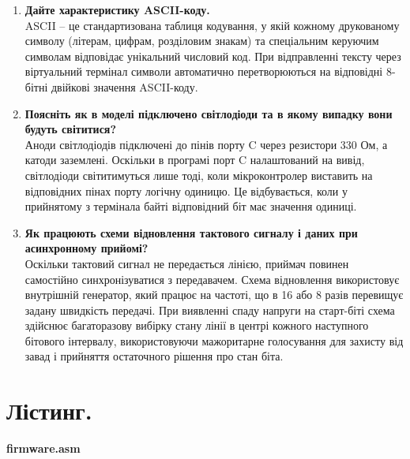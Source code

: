 \documentclass[14pt, a4paper]{extreport}
\begin{document}
\begin{enumerate}
		\item \textbf{Дайте характеристику ASCII-коду.} \\ ASCII -- це стандартизована таблиця кодування, у якій кожному друкованому символу (літерам, цифрам, розділовим знакам) та спеціальним керуючим символам відповідає унікальний числовий код. При відправленні тексту через віртуальний термінал символи автоматично перетворюються на відповідні 8-бітні двійкові значення ASCII-коду.
		
		\item \textbf{Поясніть як в моделі підключено світлодіоди та в якому випадку вони будуть світитися?} \\ Аноди світлодіодів підключені до пінів порту C через резистори 330 Ом, а катоди заземлені. Оскільки в програмі порт C налаштований на вивід, світлодіоди світитимуться лише тоді, коли мікроконтролер виставить на відповідних пінах порту логічну одиницю. Це відбувається, коли у прийнятому з термінала байті відповідний біт має значення одиниці.
		
		\item \textbf{Як працюють схеми відновлення тактового сигналу і даних при асинхронному прийомі?} \\ Оскільки тактовий сигнал не передається лінією, приймач повинен самостійно синхронізуватися з передавачем. Схема відновлення використовує внутрішній генератор, який працює на частоті, що в 16 або 8 разів перевищує задану швидкість передачі. При виявленні спаду напруги на старт-біті схема здійснює багаторазову вибірку стану лінії в центрі кожного наступного бітового інтервалу, використовуючи мажоритарне голосування для захисту від завад і прийняття остаточного рішення про стан біта.
	\end{enumerate}
	
	\pagebreak
	
	\section*{Лістинг.}
	
	\textbf{firmware.asm}
	
\end{document}
